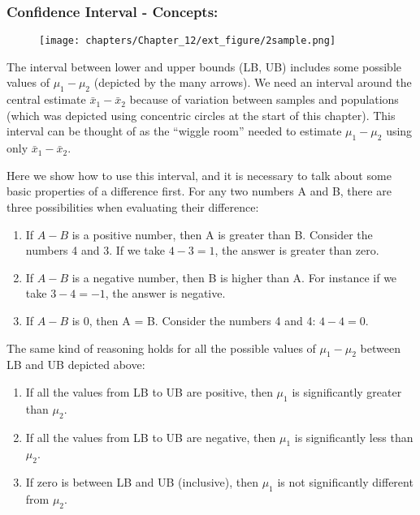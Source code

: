 \documentclass[11pt]{book}\usepackage[]{graphicx}\usepackage[]{color}
\begin{document}
\subsubsection{Confidence Interval - Concepts:}

\begin{figure}[ht]
\centering
\texttt{[image: chapters/Chapter\_12/ext\_figure/2sample.png]} %
\end{figure}

The interval between lower and upper bounds (LB, UB) includes some possible values of $\mu_1 - \mu_2$  (depicted by the many arrows). We need an interval around the central estimate $\bar{x}_1 - \bar{x}_2$ because of variation between samples and populations (which was depicted using concentric circles at the start of this chapter). This interval can be thought of as the ``wiggle room'' needed to estimate $\mu_1 - \mu_2$ using only $\bar{x}_1 - \bar{x}_2$.

Here we show how to use this interval, and it is necessary to talk about some basic properties of a difference first.  For any two numbers A and B, there are three possibilities when evaluating their difference:

\begin{enumerate}
  \item If $A - B$ is a positive number, then A is greater than B. Consider the numbers 4 and 3. If we take $4 - 3 = 1$, the answer is greater than zero.

  \item If $A - B$ is a negative number, then B is higher than A.  For instance if we take  $3 - 4 = -1$, the answer is negative.

  \item If $A - B$ is 0, then A = B. Consider the numbers 4 and 4: $4 - 4 = 0$.
\end{enumerate}

The same kind of reasoning holds for all the possible values of $\mu_1 - \mu_2$ between LB and UB depicted above:

\begin{enumerate}
  \item If all the values from LB to UB are positive, then 
  $\mu_1$ is significantly greater than $\mu_2$.

  \item If all the values from LB to UB are negative, then $\mu_1$ is significantly less than $\mu_2$. 

  \item If zero is between LB and UB (inclusive), then $\mu_1$ is not significantly different from $\mu_2$.
\end{enumerate}
\end{document}
